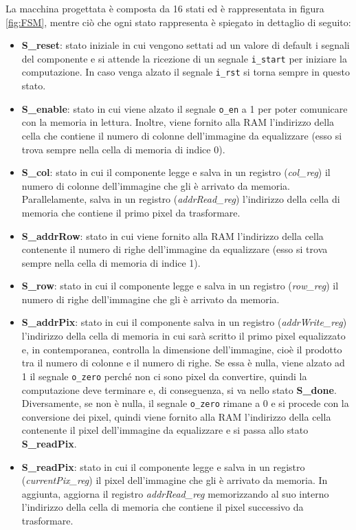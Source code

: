 \documentclass{article}
\begin{document}
La macchina progettata è composta da 16 stati ed è rappresentata in figura \ref{fig:FSM}, mentre ciò che ogni stato rappresenta è spiegato in dettaglio di seguito:
\begin{itemize}
	\item \textbf{S\_reset}: stato iniziale in cui vengono settati ad un valore di default i segnali del componente e si attende la ricezione di un segnale \verb^i_start^ per iniziare la computazione. In caso venga alzato il segnale \verb^i_rst^ si torna sempre in questo stato.
	\item \textbf{S\_enable}: stato in cui viene alzato il segnale \verb^o_en^ a 1 per poter comunicare con la memoria in lettura. Inoltre, viene fornito alla RAM l'indirizzo della cella che contiene il numero di colonne dell'immagine da equalizzare (esso si trova sempre nella cella di memoria di indice 0).
	\item \textbf{S\_col}: stato in cui il componente legge e salva in un registro (\textit{col\_reg}) il numero di colonne dell'immagine che gli è arrivato da memoria. Parallelamente, salva in un registro (\textit{addrRead\_reg}) l'indirizzo della cella di memoria che contiene il primo pixel da trasformare.
	\item \textbf{S\_addrRow}: stato in cui viene fornito alla RAM l'indirizzo della cella contenente il numero di righe dell'immagine da equalizzare (esso si trova sempre nella cella di memoria di indice 1).
	\item \textbf{S\_row}: stato in cui il componente legge e salva in un registro (\textit{row\_reg}) il numero di righe dell'immagine che gli è arrivato da memoria.
	\item \textbf{S\_addrPix}: stato in cui il componente salva in un registro (\textit{addrWrite\_reg}) l'indirizzo della cella di memoria in cui sarà scritto il primo pixel equalizzato e, in contemporanea, controlla la dimensione dell'immagine, cioè il prodotto tra il numero di colonne e il numero di righe. Se essa è nulla, viene alzato ad 1 il segnale \verb^o_zero^ perché non ci sono pixel da convertire, quindi la computazione deve terminare e, di conseguenza, si va nello stato \textbf{S\_done}. Diversamente, se non è nulla, il segnale \verb^o_zero^ rimane a 0 e si procede con la conversione dei pixel, quindi viene fornito alla RAM l'indirizzo della cella contenente il pixel dell'immagine da equalizzare e si passa allo stato \textbf{S\_readPix}.
	\item \textbf{S\_readPix}: stato in cui il componente legge e salva in un registro (\textit{currentPix\_reg}) il pixel dell'immagine che gli è arrivato da memoria. In aggiunta, aggiorna il registro \textit{addrRead\_reg} memorizzando al suo interno l'indirizzo della cella di memoria che contiene il pixel successivo da trasformare.

\end{itemize}
\end{document}
